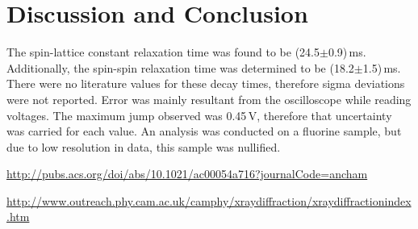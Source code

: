 \documentclass[aps,prl,twocolumn,superscriptaddress,nofootinbib]{revtex4-1}
\begin{document}
\section{Discussion and Conclusion}
The spin-lattice constant relaxation time was found to be (24.5$\pm$0.9)\,ms. Additionally, the spin-spin relaxation time was determined to be (18.2$\pm$1.5)\,ms. There were no literature values for these decay times, therefore sigma deviations were not reported. Error was mainly resultant from the oscilloscope while reading voltages. The maximum jump observed was 0.45\,V, therefore that uncertainty was carried for each value. An analysis was conducted on a fluorine sample, but due to low resolution in data, this sample was nullified.
\vfill\eject



\setlength{\parindent}{0cm}

\begin{thebibliography}{99}  %

 \url{http://pubs.acs.org/doi/abs/10.1021/ac00054a716?journalCode=ancham}    %

 \url{http://www.outreach.phy.cam.ac.uk/camphy/xraydiffraction/xraydiffractionindex.htm}






\end{thebibliography}
\end{document}
